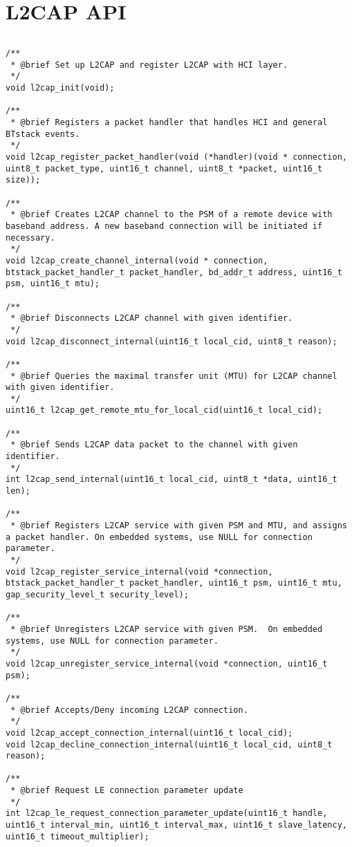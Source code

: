 \section{L2CAP API}
\label{appendix:api_l2cap}
$ $
\begin{lstlisting}
/** 
 * @brief Set up L2CAP and register L2CAP with HCI layer.
 */
void l2cap_init(void);

/** 
 * @brief Registers a packet handler that handles HCI and general BTstack events.
 */
void l2cap_register_packet_handler(void (*handler)(void * connection, uint8_t packet_type, uint16_t channel, uint8_t *packet, uint16_t size));

/** 
 * @brief Creates L2CAP channel to the PSM of a remote device with baseband address. A new baseband connection will be initiated if necessary.
 */
void l2cap_create_channel_internal(void * connection, btstack_packet_handler_t packet_handler, bd_addr_t address, uint16_t psm, uint16_t mtu);

/** 
 * @brief Disconnects L2CAP channel with given identifier. 
 */
void l2cap_disconnect_internal(uint16_t local_cid, uint8_t reason);

/** 
 * @brief Queries the maximal transfer unit (MTU) for L2CAP channel with given identifier. 
 */
uint16_t l2cap_get_remote_mtu_for_local_cid(uint16_t local_cid);

/** 
 * @brief Sends L2CAP data packet to the channel with given identifier.
 */
int l2cap_send_internal(uint16_t local_cid, uint8_t *data, uint16_t len);

/** 
 * @brief Registers L2CAP service with given PSM and MTU, and assigns a packet handler. On embedded systems, use NULL for connection parameter.
 */
void l2cap_register_service_internal(void *connection, btstack_packet_handler_t packet_handler, uint16_t psm, uint16_t mtu, gap_security_level_t security_level);

/** 
 * @brief Unregisters L2CAP service with given PSM.  On embedded systems, use NULL for connection parameter.
 */
void l2cap_unregister_service_internal(void *connection, uint16_t psm);

/** 
 * @brief Accepts/Deny incoming L2CAP connection.
 */
void l2cap_accept_connection_internal(uint16_t local_cid);
void l2cap_decline_connection_internal(uint16_t local_cid, uint8_t reason);

/** 
 * @brief Request LE connection parameter update
 */
int l2cap_le_request_connection_parameter_update(uint16_t handle, uint16_t interval_min, uint16_t interval_max, uint16_t slave_latency, uint16_t timeout_multiplier);


\end{lstlisting}
